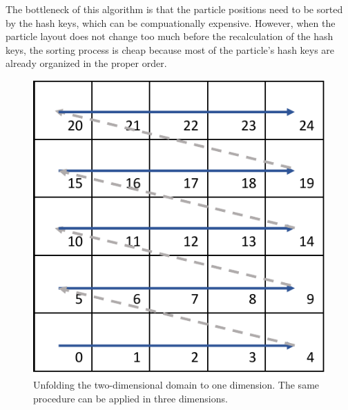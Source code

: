 \documentclass[a4paper,12pt,openany]{book}
\theoremstyle{break}
\begin{document}
The bottleneck of this algorithm is that the particle positions need to be sorted by the hash keys, which can be compuationally expensive. However, when the particle layout does not change too much before the recalculation of the hash keys, the sorting process is cheap because most of the particle's hash keys are already organized in the proper order.\\
\begin{figure}[H]
  \includegraphics[scale=0.6]{hash_key.pdf}
  \centering
  \caption{Unfolding the two-dimensional domain to one dimension. The same procedure can be applied in three dimensions.}
  \label{fig:unfolding}
\end{figure}\vspace*{3pt}
\end{document}
